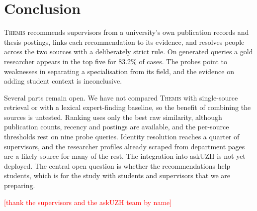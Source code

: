 \documentclass[sigconf,nonacm]{acmart}
\newcommand{\TODO}[1]{\textcolor{red}{[#1]}}
\newcommand{\sys}{\textsc{Themis}}
\begin{document}
\section{Conclusion}

\sys{} recommends supervisors from a university's own publication records and thesis postings, links each recommendation to its evidence, and resolves people across the two sources with a deliberately strict rule. On generated queries a gold researcher appears in the top five for 83.2\% of cases. The probes point to weaknesses in separating a specialisation from its field, and the evidence on adding student context is inconclusive.

Several parts remain open. We have not compared \sys{} with single-source retrieval or with a lexical expert-finding baseline, so the benefit of combining the sources is untested. Ranking uses only the best raw similarity, although publication counts, recency and postings are available, and the per-source thresholds rest on nine probe queries. Identity resolution reaches a quarter of supervisors, and the researcher profiles already scraped from department pages are a likely source for many of the rest. The integration into askUZH is not yet deployed. The central open question is whether the recommendations help students, which is for the study with students and supervisors that we are preparing.

\begin{acks}
\TODO{thank the supervisors and the askUZH team by name}
\end{acks}



\end{document}
